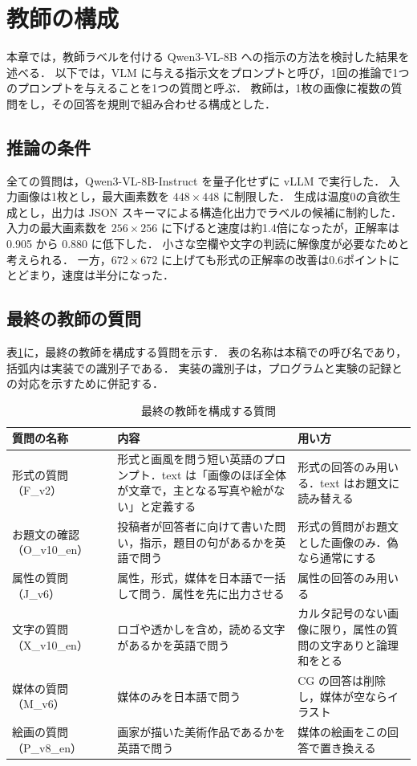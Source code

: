 \section{教師の構成}
\label{sec_teacher}
本章では，教師ラベルを付ける Qwen3-VL-8B への指示の方法を検討した結果を述べる．
以下では，VLM に与える指示文をプロンプトと呼び，1回の推論で1つのプロンプトを与えることを1つの質問と呼ぶ．
教師は，1枚の画像に複数の質問をし，その回答を規則で組み合わせる構成とした．

\subsection{推論の条件}
全ての質問は，Qwen3-VL-8B-Instruct を量子化せずに vLLM で実行した．
入力画像は1枚とし，最大画素数を $ 448 \times 448 $ に制限した．
生成は温度0の貪欲生成とし，出力は JSON スキーマによる構造化出力でラベルの候補に制約した．
入力の最大画素数を $ 256 \times 256 $ に下げると速度は約1.4倍になったが，正解率は 0.905 から 0.880 に低下した．
小さな空欄や文字の判読に解像度が必要なためと考えられる．
一方，$ 672 \times 672 $ に上げても形式の正解率の改善は0.6ポイントにとどまり，速度は半分になった．

\subsection{最終の教師の質問}
表\ref{tab_questions}に，最終の教師を構成する質問を示す．
表の名称は本稿での呼び名であり，括弧内は実装での識別子である．
実装の識別子は，プログラムと実験の記録との対応を示すために併記する．

\begin{table}[t]
    \centering
    \caption{最終の教師を構成する質問}
    \label{tab_questions}
    \small
    \begin{tabular}{>{\raggedright\arraybackslash}p{}>{\raggedright\arraybackslash}p{}>{\raggedright\arraybackslash}p{}}
        \toprule
        質問の名称 & 内容 & 用い方 \\
        \midrule
        形式の質問（F\_v2） & 形式と画風を問う短い英語のプロンプト．text は「画像のほぼ全体が文章で，主となる写真や絵がない」と定義する & 形式の回答のみ用いる．text はお題文に読み替える \\
        お題文の確認（O\_v10\_en） & 投稿者が回答者に向けて書いた問い，指示，題目の句があるかを英語で問う & 形式の質問がお題文とした画像のみ．偽なら通常にする \\
        属性の質問（J\_v6） & 属性，形式，媒体を日本語で一括して問う．属性を先に出力させる & 属性の回答のみ用いる \\
        文字の質問（X\_v10\_en） & ロゴや透かしを含め，読める文字があるかを英語で問う & カルタ記号のない画像に限り，属性の質問の文字ありと論理和をとる \\
        媒体の質問（M\_v6） & 媒体のみを日本語で問う & CG の回答は削除し，媒体が空ならイラスト \\
        絵画の質問（P\_v8\_en） & 画家が描いた美術作品であるかを英語で問う & 媒体の絵画をこの回答で置き換える \\
        \bottomrule
    \end{tabular}
\end{table}


